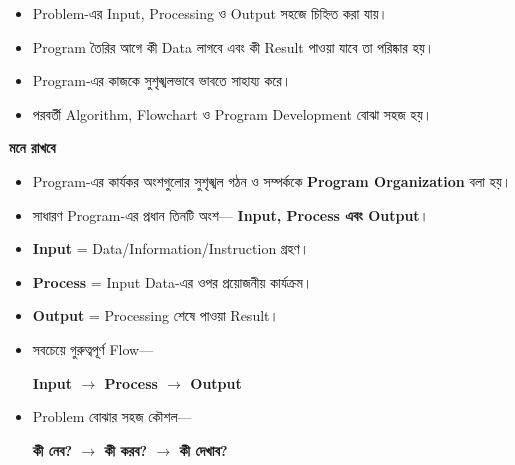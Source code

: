 
\begin{itemize}

\item Problem-এর Input, Processing ও Output সহজে চিহ্নিত করা যায়।

\item Program তৈরির আগে কী Data লাগবে এবং কী Result পাওয়া যাবে
তা পরিষ্কার হয়।

\item Program-এর কাজকে সুশৃঙ্খলভাবে ভাবতে সাহায্য করে।

\item পরবর্তী Algorithm, Flowchart ও Program Development বোঝা সহজ হয়।

\end{itemize}

\begin{rememberbox}

\textbf{\color{deepOrange}মনে রাখবে}

\begin{itemize}

\item Program-এর কার্যকর অংশগুলোর সুশৃঙ্খল গঠন ও সম্পর্ককে
\textbf{Program Organization} বলা হয়।

\item সাধারণ Program-এর প্রধান তিনটি অংশ—
\textbf{Input, Process এবং Output}।

\item \textbf{Input} = Data/Information/Instruction গ্রহণ।

\item \textbf{Process} = Input Data-এর ওপর প্রয়োজনীয় কার্যক্রম।

\item \textbf{Output} = Processing শেষে পাওয়া Result।

\item সবচেয়ে গুরুত্বপূর্ণ Flow—

\begin{center}

\textbf{
Input
\(\longrightarrow\)
Process
\(\longrightarrow\)
Output
}

\end{center}

\item Problem বোঝার সহজ কৌশল—

\begin{center}

\textbf{
কী নেব?
\(\longrightarrow\)
কী করব?
\(\longrightarrow\)
কী দেখাব?
}

\end{center}

\end{itemize}

\end{rememberbox}

\small

